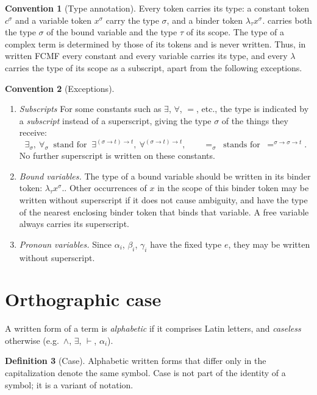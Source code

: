 \documentclass[11pt,a4paper]{article}
\theoremstyle{definition}
\newtheorem{definition}{Definition}[section]
\newtheorem{convention}[definition]{Convention}
\theoremstyle{plain}
\begin{document}
\begin{convention}[Type annotation]
Every token carries its type: a constant token $c^\sigma$ and a variable token $x^\sigma$ carry the type $\sigma$, and a binder token $\lambda_\tau x^\sigma.$ carries both the type $\sigma$ of the bound variable and the type $\tau$ of its scope. The type of a complex term is determined by those of its tokens and is never written. Thus, in written FCMF every constant and every variable carries its type, and every $\lambda$ carries the type of its scope as a subscript, apart from the following exceptions. 
\end{convention}

\begin{convention}[Exceptions]
\begin{enumerate}[label=(E\arabic*),itemsep=2pt]
  \item \emph{Subscripts} For some constants such as $\exists$, $\forall$, $=$, etc., the type is indicated by a \emph{subscript} instead of a superscript, giving the type $\sigma$ of the things they receive:
  \[
    \exists_\sigma,\ \forall_\sigma\ \text{ stand for }\ \exists^{(\sigma\to t)\to t},\ \forall^{(\sigma\to t)\to t},\qquad
    =_\sigma\ \text{ stands for }\ =^{\sigma\to\sigma\to t}.
  \]
  No further superscript is written on these constants.
  \item \emph{Bound variables.} The type of a bound variable should be written in its binder token: $\lambda_\tau x^\sigma.$. Other occurrences of $x$ in the scope of this binder token may be written without superscript if it does not cause ambiguity, and have the type of the nearest enclosing binder token that binds that variable. A free variable always carries its superscript.
  \item \emph{Pronoun variables.} Since $\alpha_i$, $\beta_i$, $\gamma_i$ have the fixed type $e$, they may be written without superscript. 
\end{enumerate}
\end{convention}

\section{Orthographic case}\label{sec:case}

A written form of a term is \emph{alphabetic} if it comprises Latin letters, and \emph{caseless} otherwise (e.g.\ $\land$, $\exists$, $\vdash$, $\alpha_i$).

\begin{definition}[Case]
Alphabetic written forms that differ only in the capitalization denote the same symbol. Case is not part of the identity of a symbol; it is a variant of notation.
\end{definition}
\end{document}
